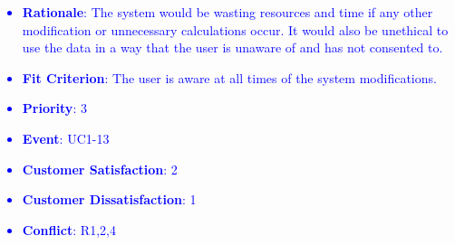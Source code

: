 \documentclass[12pt, titlepage]{article}
\newcounter{reqnum} %
\newcounter{freqnum} %
\begin{document}
\begin{itemize}
\textcolor{blue}{
\item[NFR\refstepcounter{freqnum}\thefreqnum
\label{NFR}:] 
\begin{itemize}
    \item \textbf{Rationale}: The system would be wasting resources and time if any other modification or unnecessary calculations occur. It would also be unethical to use the data in a way that the user is unaware of and has not consented to. 
    \item \textbf{Fit Criterion}: The user is aware at all times of the system modifications. 
    \item \textbf{Priority}: 3
    \item \textbf{Event}: UC1-13%
    \item \textbf{Customer Satisfaction}: 2
    \item \textbf{Customer Dissatisfaction}: 1
    \item \textbf{Conflict}: \textcolor{blue}{R1,2,4}
\end{itemize}
}


\end{itemize}
\end{document}
